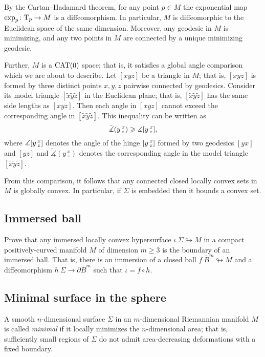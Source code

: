 By the Cartan--Hadamard theorem, for any point $p\in M$
the exponential map $\exp_p\colon\mathrm{T}_p\to M$ is a diffeomorphism.
In particular, $M$ is diffeomorphic to the Euclidean space of the same dimension.
Moreover, any geodesic in $M$ is minimizing,
and any two points in $M$ are connected by a unique minimizing geodesic,

Further, $M$ is a $\operatorname{\rm CAT}\nolimits(0)$ space; that is, it satisfies a global angle comparison which we are about to describe.
Let $[xyz]$ be a triangle in $M$;
that is, $[xyz]$ is formed by three distinct points $x,y,z$ pairwise connected by geodesics.
Consider its model triangle $[\tilde x\tilde y\tilde z]$ in the Euclidean plane;
that is, $[\tilde x\tilde y\tilde z]$ has the same side lengths as $[xyz]$.
Then each angle in $[xyz]$ cannot exceed the corresponding angle in $[\tilde x\tilde y\tilde z]$.
This inequality can be written as
\[\tilde\measuredangle(y\,^x_z)\geqslant\measuredangle[y\,{}^{x}_{z}],\]
where $\measuredangle[y\,{}^{x}_{z}]$ denotes the angle of the hinge $[y\,{}^{x}_{z}]$ formed by two geodesics $[yx]$ and $[yz]$ 
and $\tilde\measuredangle(y\,^x_z)$ denotes the corresponding angle in the model triangle $[\tilde x\tilde y\tilde z]$.

From this comparison, it follows that any connected closed locally convex sets in $M$ is globally convex.
In particular, if $\Sigma$ is embedded then it bounds a convex set.


\subsection*{Immersed ball\hard}
\label{Immersed ball}

\begin{pr}
Prove that any immersed locally convex
hypersurface $\iota\:\Sigma\looparrowright M$
in a compact positively-curved manifold $M$ of dimension $m\ge 3$ is the boundary of an immersed ball. 
That is, there is an immersion of a closed ball $f\:\bar B^m\looparrowright M$ and a diffeomorphism $h\:\Sigma\to\partial \bar B^m$
such that $\iota=f\circ h$.
\end{pr}

\subsection*{Minimal surface in the sphere}
\label{minimal surface}\label{almgren} 

A  smooth $n$-dimensional surface $\Sigma$ in
an $m$-dimensional Riemannian manifold $M$ is called \emph{minimal}
if it locally minimizes the $n$-dimensional area;
that is, sufficiently small regions of $\Sigma$ do not admit area-decreasing deformations with a fixed boundary.

